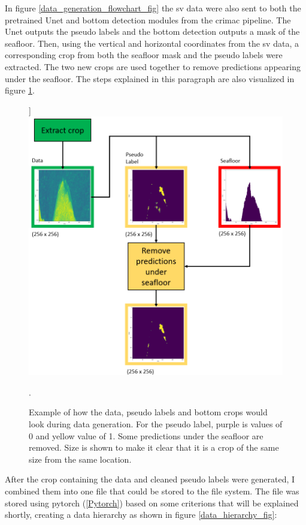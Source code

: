         In figure \ref{data_generation_flowchart_fig} the  \gls{sv} data were also sent to both the pretrained Unet and bottom detection modules from the \gls{crimac} pipeline. The Unet outputs the pseudo labels and the bottom detection outputs a mask of the seafloor. Then, using the vertical and horizontal coordinates from the \gls{sv} data, a corresponding crop from both the seafloor mask and the pseudo labels were extracted. The two new crops are used together to remove predictions appearing under the seafloor. The steps explained in this paragraph are also visualized in figure \ref{crop_extract_fig}.
        \clearpage
        \begin{figure}[H]]
            \centering
            \includegraphics[scale=0.5]{figures/crop_extract_illustration.png}
            \caption{Example of how the data, pseudo labels and bottom crops would look during data generation. For the pseudo label, purple is values of 0 and yellow value of 1. Some predictions under the seafloor are removed.  Size is shown to make it clear that it is a crop of the same size from the same location.}.
          	\medskip 
            \label{crop_extract_fig}
        \end{figure}
        
        After the crop containing the data and cleaned pseudo labels were generated, I combined them into one file that could be stored to the file system. The file was stored using pytorch (\ref{Pytorch}) based on some criterions that will be explained shortly, creating a data hierarchy as shown in figure \ref{data_hierarchy_fig}:
        
